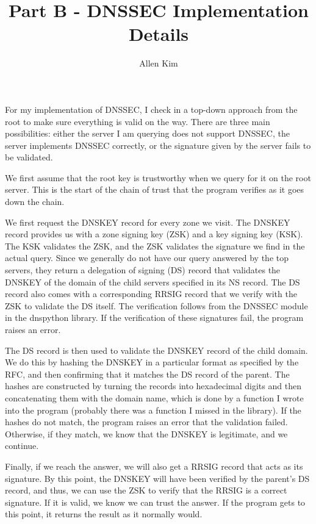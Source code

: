 \documentclass[12pt]{article}
\title{\vspace{-0.0cm}Part B - DNSSEC Implementation Details}
\date{}
\author{Allen Kim}
\begin{document}
\maketitle

For my implementation of DNSSEC, I check in a top-down approach from the root to
make sure everything is valid on the way. There are three main possibilities:
either the server I am querying does not support DNSSEC, the server implements
DNSSEC correctly, or the signature given by the server fails to be validated.

We first assume that the root key is trustworthy when we query for it on the
root server. This is the start of the chain of trust that the program verifies
as it goes down the chain.

We first request the DNSKEY record for every zone we visit. The DNSKEY record
provides us with a zone signing key (ZSK) and a key signing key (KSK). The KSK
validates the ZSK, and the ZSK validates the signature we find in the actual
query. Since we generally do not have our query answered by the top servers,
they return a delegation of signing (DS) record that validates the DNSKEY of the
domain of the child servers specified in its NS record. The DS record also comes
with a corresponding RRSIG record that we verify with the ZSK to validate the DS
itself. The verification follows from the DNSSEC module in the dnspython
library. If the verification of these signatures fail, the program raises an
error.

The DS record is then used to validate the DNSKEY record of the child domain. We
do this by hashing the DNSKEY in a particular format as specified by the RFC,
and then confirming that it matches the DS record of the parent. The hashes
are constructed by turning the records into hexadecimal digits and then
concatenating them with the domain name, which is done by a function I wrote
into the program (probably there was a function I missed in the library). If the hashes do not match, the program raises an error
that the validation failed. Otherwise, if they match, we know that the
DNSKEY is legitimate, and we continue.

Finally, if we reach the answer, we will also get a RRSIG record that acts as
its signature. By this point, the DNSKEY will have been verified by the parent's
DS record, and thus, we can use the ZSK to verify that the RRSIG is a correct
signature. If it is valid, we know we can trust the answer. If the program gets
to this point, it returns the result as it normally would.
\end{document}
